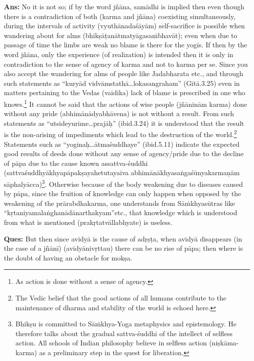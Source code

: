 \textbf{Ans:} No it is not so; if by the word jñāna, samādhi is implied then even though there is a contradiction of both (karma and jñāna) coexisting simultaneously, during the intervals of activity (vyuthānadaśāyām) self-sacrifice is possible when wandering about for alms (bhikṣāṭanātmatyāgasaṁbhavāt); even when due to passage of time the limbs are weak no blame is there for the yogīs. If then by the word jñāna, only the experience (of realization) is intended then it is only in contradiction to the sense of agency of karma and not to karma per se. Since you also accept the wandering for alms of people like Jadabharata etc., and through such statements as “kuryād vidvāmstathā…lokasangraham” (Gītā.3.25) even in matters pertaining to the Vedas (vaidika) lack of blame is prescribed in one who knows.\footnote{As action is done without a sense of agency.}  It cannot be said that the actions of wise people (jñāninām karma) done without any pride (abhimānādyabhāvena) is not without a result. From such statements as “utsideyurime…prajāḥ” (ibid.3.24) it is understood that the result is the non-arising of impediments which lead to the destruction of the world.\footnote{The Vedic belief that the good actions of all humans contribute to the maintenance of dharma and stability
of the world is echoed here.} Statements such as “yoginaḥ…ātmaśuddhaye” (ibid.5.11) indicate the expected good results of deeds done without any sense of agency/pride due to the decline of pāpa due to the cause known as\break sattva-śuddhi (sattvaśuddhyākhyapāpakṣayahetutayaiva abhimānā\-khyasaṅgaśūnyakarmaṇām sāphalyācca)\footnote{Bhikṣu is committed to Sāṁkhya-Yoga metaphysics and epistemology. He therefore talks about the gradual
sattva-śuddhi of the intellect of selfless action. All schools of Indian philosophy believe in selfless action
(niṣkāma-karma) as a preliminary step in the quest for liberation.}. Otherwise because of the body weakening due to diseases caused by pāpa, since the fruition of knowledge can only happen when opposed by the weakening of the prārabdhakarma, one understands from Sāṁkhyasūtras like “kṛtaniyamalaṅghanādānarthakyam”etc., that knowledge which is understood from what is mentioned (prakṛtatvāllabhyate) is useless.

\textbf{Ques:} But then since avidyā is the cause of adṛṣṭa, when avidyā disappears (in the case of a jñānī) (avidyānivṛttau) there can be no rise of pāpa; then where is the doubt of having an obstacle for mokṣa.

